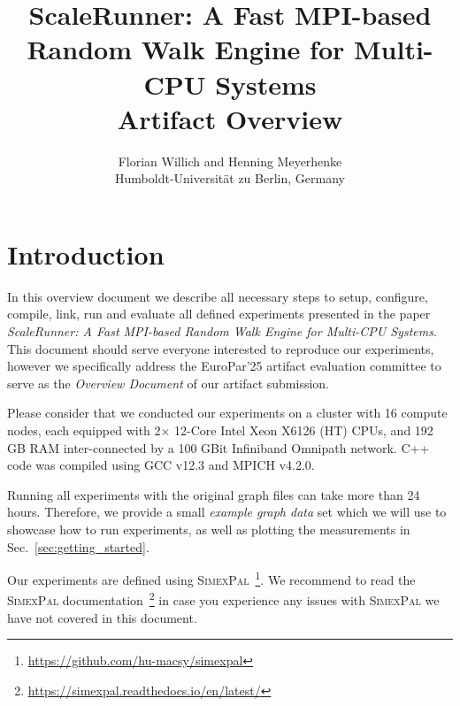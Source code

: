 \documentclass[11pt, a4paper]{scrartcl}
\newcommand{\simex}{\textsc{Simex\-Pal}\xspace}
\begin{document}
\lstset{  
  tabsize=2, 
  showspaces=false, 
  showstringspaces=false, 
  float=[htb], 
  captionpos=b, 
  basicstyle=\ttfamily\footnotesize,
  frame=single, %
  numbers=left, 
  numberstyle=\tiny, 
  numberblanklines=false, 
  breaklines=true
} 

\title{\small{ScaleRunner: A Fast MPI-based \\ Random Walk Engine for Multi-CPU Systems} \\ \LARGE{Artifact Overview}}

\author{Florian Willich and Henning Meyerhenke \\ Humboldt-Universit\"at zu Berlin, Germany}

\maketitle

\section{Introduction}

In this overview document we describe all necessary steps to setup, configure,
compile, link, run and evaluate all defined experiments presented in the paper
\textit{ScaleRunner: A Fast MPI-based Random Walk Engine for Multi-CPU Systems}.
This document should serve everyone interested to reproduce our experiments,
however we specifically address the EuroPar'25 artifact evaluation committee to
serve as the \emph{Overview Document} of our artifact submission.

Please consider that we conducted our experiments on a cluster with 16 compute
nodes, each equipped with 2$\times$ 12-Core Intel Xeon X6126 (HT) CPUs, and 192
GB RAM inter-connected by a 100 GBit Infiniband Omnipath network. C++ code was
compiled using GCC v12.3 and MPICH v4.2.0.

Running all experiments with the original graph files can take more than 24
hours. Therefore, we provide a small \emph{example graph data} set which we will
use to showcase how to run experiments, as well as plotting the measurements in
Sec.~\ref{sec:getting_started}.

Our experiments are defined using
\simex~\footnote{\url{https://github.com/hu-macsy/simexpal}}. We recommend to
read the \simex
documentation~\footnote{\url{https://simexpal.readthedocs.io/en/latest/}} in
case you experience any issues with \simex we have not covered in this
document.
\end{document}
